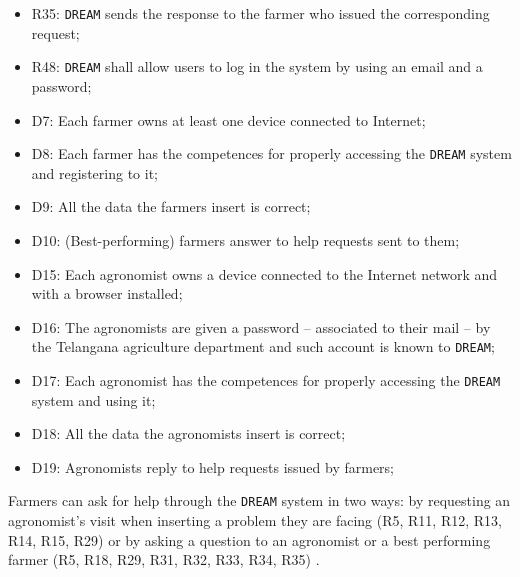 \documentclass{article}
\begin{document}
\begin{itemize}
    \item R35: \verb|DREAM| sends the response to the farmer who issued the corresponding request;
    
    \item R48: \verb|DREAM| shall allow users to log in the system by using an email and a password;
    
    \item D7: Each farmer owns at least one device connected to Internet;
    
    \item D8: Each farmer has the competences for properly accessing the \verb|DREAM| system and registering to it;
    
    \item D9: All the data the farmers insert is correct;
    
    \item D10: (Best-performing) farmers answer to help requests sent to them;
    
    \item D15: Each agronomist owns a device connected to the Internet network and with a browser installed;

    \item D16: The agronomists are given a password – associated to their mail – by the Telangana agriculture department and such account is known to \verb|DREAM|;

    \item D17: Each agronomist has the competences for properly accessing the \verb|DREAM| system and using it;
  
    \item D18: All the data the agronomists insert is correct;
  
    \item D19: Agronomists reply to help requests issued by farmers;

\end{itemize}
Farmers can ask for help through the \verb|DREAM| system in two ways: by requesting an agronomist's visit when inserting a problem they are facing (R5, R11, R12, R13, R14, R15, R29) or by asking a question to an agronomist or a best performing farmer (R5, R18, R29, R31, R32, R33, R34, R35) .
\end{document}
